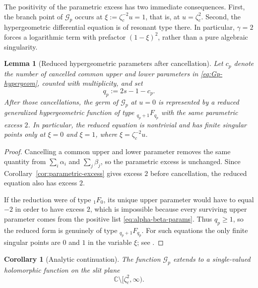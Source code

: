 \documentclass[11pt]{amsart}
\numberwithin{equation}{section}
\theoremstyle{plain}
\newtheorem{lemma}[theorem]{Lemma}
\newtheorem{corollary}[theorem]{Corollary}
\theoremstyle{definition}
\theoremstyle{remark}
\newcommand{\CC}{\mathbb{C}}
\begin{document}
The positivity of the parametric excess has two immediate consequences.
First, the branch point of \(\mathcal G_p\) occurs at
\(\xi:=\zeta_c^{-2}u=1\), that is, at \(u=\zeta_c^2\). Second, the
hypergeometric differential equation is of resonant type there. In
particular, \(\gamma=2\) forces a logarithmic term with prefactor
\((1-\xi)^2\), rather than a pure algebraic singularity.

\begin{lemma}[Reduced hypergeometric parameters after cancellation]
	\label{lem:reduced-hypergeom-data}
	Let \(c_p\) denote the number of cancelled common upper and lower
	parameters in \eqref{eq:Gp-hypergeom}, counted with multiplicity, and set
	\[
		q_p:=2s-1-c_p.
	\]
	After those cancellations, the germ of \(\mathcal G_p\) at \(u=0\) is
	represented by a reduced generalized hypergeometric function of type
	\({}_{q_p+1}F_{q_p}\) with the same parametric excess \(2\). In
	particular, the reduced equation is nontrivial and has finite singular
	points only at \(\xi=0\) and \(\xi=1\), where \(\xi=\zeta_c^{-2}u\).
\end{lemma}

\begin{proof}
	Cancelling a common upper and lower parameter removes the same quantity
	from \(\sum_i\alpha_i\) and \(\sum_j\beta_j\), so the parametric excess is
	unchanged. Since Corollary~\ref{cor:parametric-excess} gives excess \(2\)
	before cancellation, the reduced equation also has excess \(2\).

	If the reduction were of type \({}_1F_0\), its unique upper parameter
	would have to equal \(-2\) in order to have excess \(2\), which is
	impossible because every surviving upper parameter comes from the positive
	list \eqref{eq:alpha-beta-params}. Thus \(q_p\ge1\), so the reduced form is
	genuinely of type \({}_{q_p+1}F_{q_p}\). For such equations the only finite
	singular points are \(0\) and \(1\) in the variable \(\xi\); see
	\cite[\S16.8, \S16.11]{NIST:DLMF}.
\end{proof}

\begin{corollary}[Analytic continuation]
	\label{cor:Gp-continuation}
	The function \(\mathcal G_p\) extends to a single-valued holomorphic
	function on the slit plane
	\[
		\CC\setminus[\zeta_c^2,\infty).
	\]
\end{corollary}
\end{document}
